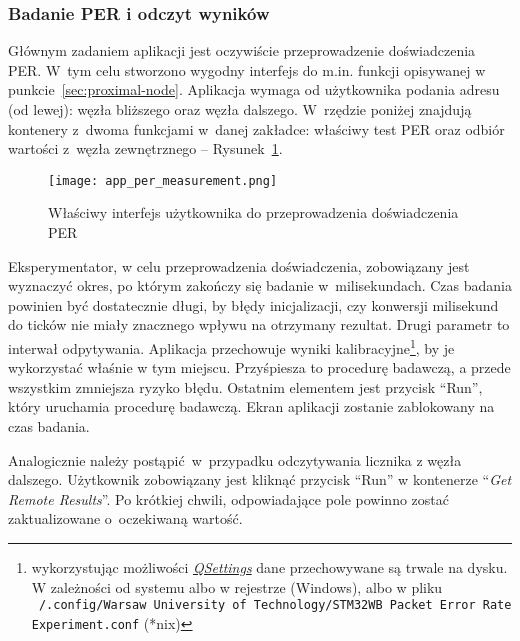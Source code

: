 \subsubsection{Badanie PER i odczyt wyników}
Głównym zadaniem aplikacji jest oczywiście przeprowadzenie doświadczenia PER. W~tym celu
stworzono wygodny interfejs do m.in. funkcji opisywanej w punkcie~\ref{sec:proximal-node}.
Aplikacja wymaga od użytkownika podania adresu (od lewej): węzła bliższego oraz
węzła dalszego. W~rzędzie poniżej znajdują kontenery z~dwoma funkcjami w~danej zakładce:
właściwy test PER oraz odbiór wartości z~węzła zewnętrznego -- Rysunek~\ref{app_per_measurement}.
 
\begin{figure}[!ht]
	\centering \texttt{[image: app\_per\_measurement.png]}
	\caption{Właściwy interfejs użytkownika do przeprowadzenia doświadczenia PER}
	\label{app_per_measurement}
\end{figure}

Eksperymentator, w celu przeprowadzenia doświadczenia, zobowiązany jest wyznaczyć okres, po 
którym zakończy się badanie w~milisekundach. Czas badania powinien być dostatecznie
długi, by błędy inicjalizacji, czy konwersji milisekund do ticków nie miały znacznego wpływu
na otrzymany rezultat. Drugi parametr to interwał odpytywania. Aplikacja przechowuje
wyniki kalibracyjne\footnote{wykorzystując możliwości \href{https://doc.qt.io/qt-5/qsettings.html}{\textit{QSettings}}
dane przechowywane są trwale na dysku. W zależności od systemu albo w rejestrze (Windows),
albo w pliku \texttt{~/.config/Warsaw University of Technology/STM32WB Packet Error Rate Experiment.conf} (*nix)},
by je wykorzystać właśnie w tym miejscu. Przyśpiesza to procedurę badawczą, a przede wszystkim
zmniejsza ryzyko błędu. Ostatnim elementem jest przycisk \enquote{Run}, który uruchamia procedurę
badawczą. Ekran aplikacji zostanie zablokowany na czas badania.

Analogicznie należy postąpić w~przypadku odczytywania licznika z węzła dalszego. Użytkownik
zobowiązany jest kliknąć przycisk \enquote{Run} w kontenerze \enquote{\textit{Get Remote Results}}.
Po krótkiej chwili, odpowiadające pole powinno zostać zaktualizowane o~oczekiwaną wartość.


